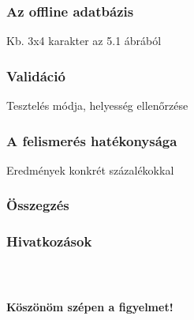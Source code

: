 \documentclass{beamer}
\begin{document}
\begin{frame}[fragile]
\frametitle{Az offline adatbázis}

Kb. 3x4 karakter az 5.1 ábrából

\end{frame}

\begin{frame}[fragile]
\frametitle{Validáció}

Tesztelés módja, helyesség ellenőrzése

\end{frame}

\begin{frame}[fragile]
\frametitle{A felismerés hatékonysága}

Eredmények konkrét százalékokkal

\end{frame}

\begin{frame}[fragile]
\frametitle{Összegzés}


\end{frame}


\begin{frame}[fragile]
\frametitle{Hivatkozások}


\end{frame}

\begin{frame}[fragile]
    \frametitle{\ }

\begin{center}
\Large \textbf{Köszönöm szépen a figyelmet!}
\end{center}

\end{frame}
\end{document}
